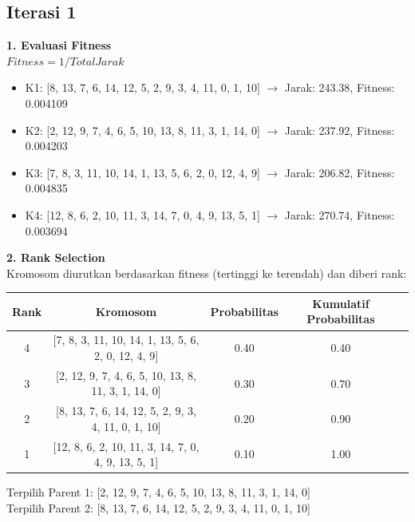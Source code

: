 \documentclass[12pt]{article}
\begin{document}
\subsection*{Iterasi 1}
\textbf{1. Evaluasi Fitness}\\$Fitness = 1 / Total Jarak$
\begin{itemize}
\item K1: [8, 13, 7, 6, 14, 12, 5, 2, 9, 3, 4, 11, 0, 1, 10] $\rightarrow$ Jarak: 243.38, Fitness: 0.004109
\item K2: [2, 12, 9, 7, 4, 6, 5, 10, 13, 8, 11, 3, 1, 14, 0] $\rightarrow$ Jarak: 237.92, Fitness: 0.004203
\item K3: [7, 8, 3, 11, 10, 14, 1, 13, 5, 6, 2, 0, 12, 4, 9] $\rightarrow$ Jarak: 206.82, Fitness: 0.004835
\item K4: [12, 8, 6, 2, 10, 11, 3, 14, 7, 0, 4, 9, 13, 5, 1] $\rightarrow$ Jarak: 270.74, Fitness: 0.003694
\end{itemize}
\vspace{0.5cm}\textbf{2. Rank Selection}\\Kromosom diurutkan berdasarkan fitness (tertinggi ke terendah) dan diberi rank:
\begin{table}[h!]\centering\begin{tabular}{ccccc}\toprule Rank & Kromosom & Probabilitas & Kumulatif Probabilitas \\ \midrule
4 & [7, 8, 3, 11, 10, 14, 1, 13, 5, 6, 2, 0, 12, 4, 9] & 0.40 & 0.40 \\
3 & [2, 12, 9, 7, 4, 6, 5, 10, 13, 8, 11, 3, 1, 14, 0] & 0.30 & 0.70 \\
2 & [8, 13, 7, 6, 14, 12, 5, 2, 9, 3, 4, 11, 0, 1, 10] & 0.20 & 0.90 \\
1 & [12, 8, 6, 2, 10, 11, 3, 14, 7, 0, 4, 9, 13, 5, 1] & 0.10 & 1.00 \\
\bottomrule\end{tabular}\end{table}
Terpilih Parent 1: [2, 12, 9, 7, 4, 6, 5, 10, 13, 8, 11, 3, 1, 14, 0]\\
Terpilih Parent 2: [8, 13, 7, 6, 14, 12, 5, 2, 9, 3, 4, 11, 0, 1, 10]\\
\end{document}

